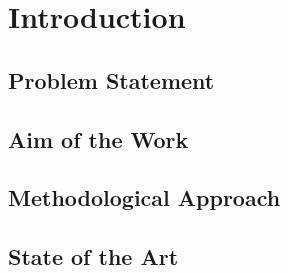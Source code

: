 \documentclass[draft,final]{vutinfth} %
\begin{document}
    \frontmatter %


    \AddStatementPage


    \begin{acknowledgements*}
    \end{acknowledgements*}


    \begin{abstract}
    \end{abstract}


    \tableofcontents %

    \mainmatter


    \chapter{Introduction}


    \section{Problem Statement}


    \section{Aim of the Work}


    \section{Methodological Approach}


    \section{State of the Art}
\end{document}
